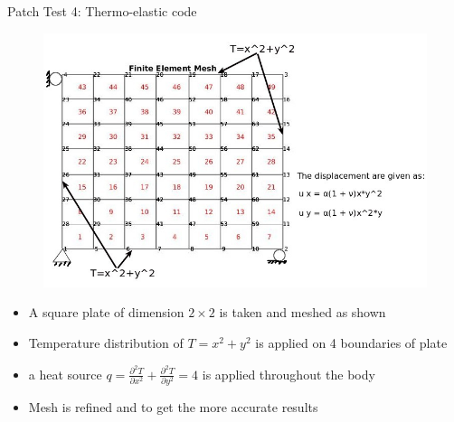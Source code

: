 \documentclass{beamer}
\begin{document}
\begin{frame}[t,fragile]{Patch Test 4: Thermo-elastic code}
    \vspace{-.5cm}
    \footnotesize  
\begin{figure}[H]
    \centering
    \includegraphics[scale=.2]{elements_7^2_1.jpg}
\end{figure}
    \vspace{-.5cm}
\begin{itemize}
      \item A square plate of dimension $2\times 2$ is taken and meshed as shown
      \item Temperature distribution of $T=x^2+y^2$ is applied on 4 boundaries of plate
      \item a heat source $q=\frac{\partial^2 T}{\partial x^2}+\frac{\partial^2 T}{\partial y^2}=4$ is applied throughout the body 
    \item Mesh is refined and to get the more accurate results 
\end{itemize}
\end{frame}
\end{document}
